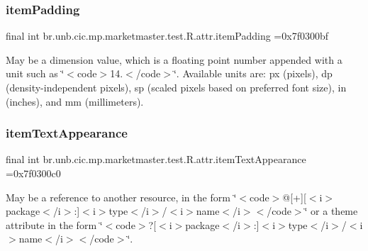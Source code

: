 \subsubsection{\texorpdfstring{item\+Padding}{itemPadding}}
{\footnotesize\ttfamily final int br.\+unb.\+cic.\+mp.\+marketmaster.\+test.\+R.\+attr.\+item\+Padding =0x7f0300bf\hspace{0.3cm}{\ttfamily [static]}}

May be a dimension value, which is a floating point number appended with a unit such as \char`\"{}$<$code$>$14.\+5sp$<$/code$>$\char`\"{}. Available units are\+: px (pixels), dp (density-\/independent pixels), sp (scaled pixels based on preferred font size), in (inches), and mm (millimeters). \mbox{\label{classbr_1_1unb_1_1cic_1_1mp_1_1marketmaster_1_1test_1_1R_1_1attr_ae727a0c70e90ca9a2492bfc4f9407e0a}} 
\subsubsection{\texorpdfstring{item\+Text\+Appearance}{itemTextAppearance}}
{\footnotesize\ttfamily final int br.\+unb.\+cic.\+mp.\+marketmaster.\+test.\+R.\+attr.\+item\+Text\+Appearance =0x7f0300c0\hspace{0.3cm}{\ttfamily [static]}}

May be a reference to another resource, in the form \char`\"{}$<$code$>$@\mbox{[}+\mbox{]}\mbox{[}$<$i$>$package$<$/i$>$\+:\mbox{]}$<$i$>$type$<$/i$>$/$<$i$>$name$<$/i$>$$<$/code$>$\char`\"{} or a theme attribute in the form \char`\"{}$<$code$>$?\mbox{[}$<$i$>$package$<$/i$>$\+:\mbox{]}$<$i$>$type$<$/i$>$/$<$i$>$name$<$/i$>$$<$/code$>$\char`\"{}. \mbox{\label{classbr_1_1unb_1_1cic_1_1mp_1_1marketmaster_1_1test_1_1R_1_1attr_ad1c23d85e2326dc9e19c3792b1b660b1}} 
